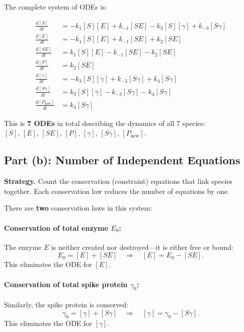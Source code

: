 \documentclass[12pt]{article}
\newcommand{\ddt}[1]{\frac{d[#1]}{dt}}
\begin{document}
\medskip
The complete system of ODEs is:

\begin{align}
  \ddt{S} &= -k_1 [S][E] + k_{-1}[SE] - k_3 [S][\gamma] + k_{-3}[S\gamma]
  \label{eq:dS}\\[6pt]
  \ddt{E} &= -k_1 [S][E] + k_{-1}[SE] + k_2[SE]
  \label{eq:dE}\\[6pt]
  \ddt{SE} &= k_1 [S][E] - k_{-1}[SE] - k_2[SE]
  \label{eq:dSE}\\[6pt]
  \ddt{P} &= k_2[SE]
  \label{eq:dP}\\[6pt]
  \ddt{\gamma} &= -k_3 [S][\gamma] + k_{-3}[S\gamma] + k_4[S\gamma]
  \label{eq:dgamma}\\[6pt]
  \ddt{S\gamma} &= k_3[S][\gamma] - k_{-3}[S\gamma] - k_4[S\gamma]
  \label{eq:dSgamma}\\[6pt]
  \frac{d[P_{\text{new}}]}{dt} &= k_4[S\gamma]
  \label{eq:dPnew}
\end{align}

\noindent This is \textbf{7 ODEs} in total describing the dynamics of all 7 species:
$[S],\,[E],\,[SE],\,[P],\,[\gamma],\,[S\gamma],\,[P_{\text{new}}]$.

\medskip

\subsection*{Part (b): Number of Independent Equations}

\begin{mdframed}[style=solutionbox]
\textbf{\color{solutiongreen}Strategy.}
Count the conservation (constraint) equations that link species together.  Each conservation
law reduces the number of equations by one.
\end{mdframed}

\medskip
There are \textbf{two} conservation laws in this system:

\paragraph{Conservation of total enzyme $E_0$:}
The enzyme $E$ is neither created nor destroyed---it is either free or bound:
\[
  E_0 = [E] + [SE] \quad \Longrightarrow \quad [E] = E_0 - [SE].
\]
This eliminates the ODE for $[E]$.

\paragraph{Conservation of total spike protein $\gamma_0$:}
Similarly, the spike protein is conserved:
\[
  \gamma_0 = [\gamma] + [S\gamma] \quad \Longrightarrow \quad [\gamma] = \gamma_0 - [S\gamma].
\]
This eliminates the ODE for $[\gamma]$.
\end{document}
